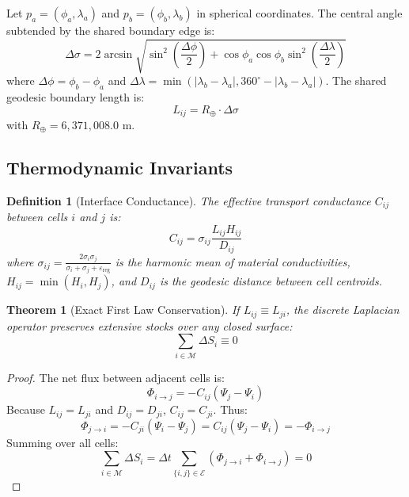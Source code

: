 \documentclass[10pt,twocolumn,letterpaper]{article}
\newtheorem{theorem}{Theorem}
\newtheorem{definition}{Definition}
\begin{document}
Let $p_a = (\phi_a, \lambda_a)$ and $p_b = (\phi_b, \lambda_b)$ in spherical coordinates. The central angle subtended by the shared boundary edge is:
\begin{equation}
\Delta \sigma = 2 \arcsin \sqrt{\sin^2\left(\frac{\Delta \phi}{2}\right) + \cos \phi_a \cos \phi_b \sin^2\left(\frac{\Delta \lambda}{2}\right)}
\end{equation}
where $\Delta \phi = \phi_b - \phi_a$ and $\Delta \lambda = \min(|\lambda_b - \lambda_a|, 360^\circ - |\lambda_b - \lambda_a|)$. The shared geodesic boundary length is:
\begin{equation}
L_{ij} = R_\oplus \cdot \Delta \sigma
\end{equation}
with $R_\oplus = 6,371,008.0\text{ m}$.

\subsection{Thermodynamic Invariants}

\begin{definition}[Interface Conductance]
The effective transport conductance $C_{ij}$ between cells $i$ and $j$ is:
\begin{equation}
C_{ij} = \sigma_{ij} \frac{L_{ij} H_{ij}}{D_{ij}}
\end{equation}
where $\sigma_{ij} = \frac{2\sigma_i \sigma_j}{\sigma_i + \sigma_j + \varepsilon_{\text{reg}}}$ is the harmonic mean of material conductivities, $H_{ij} = \min(H_i, H_j)$, and $D_{ij}$ is the geodesic distance between cell centroids.
\end{definition}

\begin{theorem}[Exact First Law Conservation]
If $L_{ij} \equiv L_{ji}$, the discrete Laplacian operator preserves extensive stocks over any closed surface:
\begin{equation}
\sum_{i \in \mathcal{M}} \Delta S_i \equiv 0
\end{equation}
\end{theorem}
\begin{proof}
The net flux between adjacent cells is:
\begin{equation}
\Phi_{i \to j} = - C_{ij} (\Psi_j - \Psi_i)
\end{equation}
Because $L_{ij} = L_{ji}$ and $D_{ij} = D_{ji}$, $C_{ij} = C_{ji}$. Thus:
\begin{equation}
\Phi_{j \to i} = - C_{ji} (\Psi_i - \Psi_j) = C_{ij} (\Psi_j - \Psi_i) = - \Phi_{i \to j}
\end{equation}
Summing over all cells:
\begin{equation}
\sum_{i \in \mathcal{M}} \Delta S_i = \Delta t \sum_{\{i, j\} \in \mathcal{E}} (\Phi_{j \to i} + \Phi_{i \to j}) = 0
\end{equation}
\end{proof}
\end{document}
